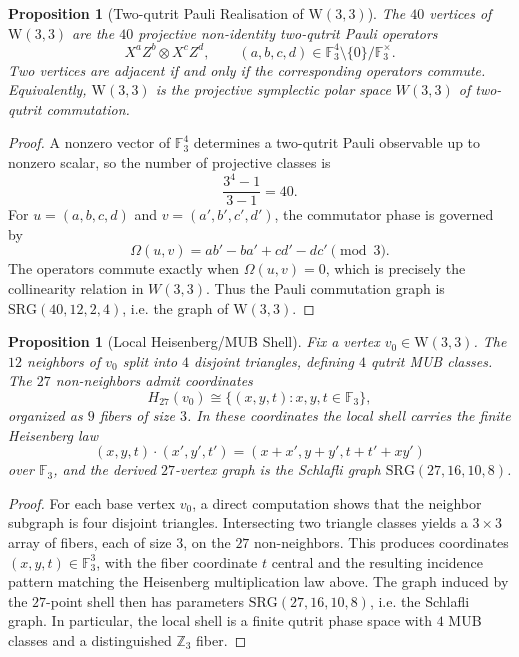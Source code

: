 \documentclass[12pt,a4paper]{article}
\newtheorem{proposition}[theorem]{Proposition}
\newcommand{\W}{\mathrm{W}(3,3)}
\newcommand{\SRG}{\mathrm{SRG}}
\begin{document}
\begin{proposition}[Two-qutrit Pauli Realisation of $\W$]
\label{prop:two-qutrit-pauli-foundation}
The $40$ vertices of $\W$ are the $40$ projective non-identity two-qutrit
Pauli operators
\[
  X^a Z^b \otimes X^c Z^d,
  \qquad (a,b,c,d) \in \mathbb{F}_3^4 \setminus \{0\} / \mathbb{F}_3^\times.
\]
Two vertices are adjacent if and only if the corresponding operators commute.
Equivalently, $\W$ is the projective symplectic polar space $W(3,3)$ of
two-qutrit commutation.
\end{proposition}

\begin{proof}
A nonzero vector of $\mathbb{F}_3^4$ determines a two-qutrit Pauli observable
up to nonzero scalar, so the number of projective classes is
\[
  \frac{3^4 - 1}{3 - 1} = 40.
\]
For $u = (a,b,c,d)$ and $v = (a',b',c',d')$, the commutator phase is governed by
\[
  \Omega(u,v) = ab' - ba' + cd' - dc' \pmod 3.
\]
The operators commute exactly when $\Omega(u,v) = 0$, which is precisely the
collinearity relation in $W(3,3)$. Thus the Pauli commutation graph is
$\SRG(40,12,2,4)$, i.e. the graph of $\W$.
\end{proof}

\begin{proposition}[Local Heisenberg/MUB Shell]
\label{prop:local-heisenberg-mub-shell}
Fix a vertex $v_0 \in \W$. The $12$ neighbors of $v_0$ split into $4$
disjoint triangles, defining $4$ qutrit MUB classes. The $27$ non-neighbors
admit coordinates
\[
  H_{27}(v_0) \cong \{(x,y,t) : x,y,t \in \mathbb{F}_3\},
\]
organized as $9$ fibers of size $3$. In these coordinates the local shell
carries the finite Heisenberg law
\[
  (x,y,t) \cdot (x',y',t') = (x+x', y+y', t+t'+xy')
\]
over $\mathbb{F}_3$, and the derived $27$-vertex graph is the Schlafli graph
$\SRG(27,16,10,8)$.
\end{proposition}

\begin{proof}
For each base vertex $v_0$, a direct computation shows that the neighbor
subgraph is four disjoint triangles. Intersecting two triangle classes yields a
$3 \times 3$ array of fibers, each of size $3$, on the $27$ non-neighbors.
This produces coordinates $(x,y,t) \in \mathbb{F}_3^3$, with the fiber
coordinate $t$ central and the resulting incidence pattern matching the
Heisenberg multiplication law above. The graph induced by the $27$-point shell
then has parameters $\SRG(27,16,10,8)$, i.e. the Schlafli graph. In
particular, the local shell is a finite qutrit phase space with $4$ MUB
classes and a distinguished $\mathbb{Z}_3$ fiber.
\end{proof}
\end{document}
